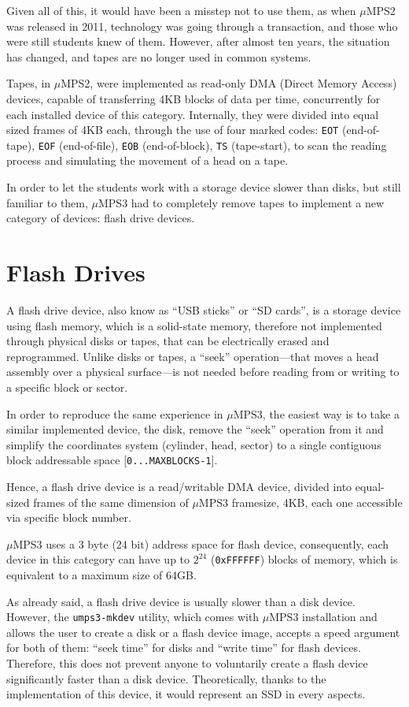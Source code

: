 \documentclass[12pt,a4paper,openright,twoside]{report}
\begin{document}
Given all of this, it would have been a misstep not to use them, as when $\mu$MPS2 was released in 2011, technology was going through a transaction, and those who were still students knew of them.
However, after almost ten years, the situation has changed, and tapes are no longer used in common systems.

Tapes, in $\mu$MPS2, were implemented as read-only DMA (Direct Memory Access) devices, capable of transferring 4KB blocks of data per time, concurrently for each installed device of this category.
Internally, they were divided into equal sized frames of 4KB each, through the use of four marked codes: \texttt{EOT} (end-of-tape), \texttt{EOF} (end-of-file), \texttt{EOB} (end-of-block), \texttt{TS} (tape-start), to scan the reading process and simulating the movement of a head on a tape.

In order to let the students work with a storage device slower than disks, but still familiar to them, $\mu$MPS3 had to completely remove tapes to implement a new category of devices: flash drive devices.

\section{Flash Drives}
A flash drive device, also know as ``USB sticks'' or ``SD cards'', is a storage device using flash memory, which is a solid-state memory, therefore not implemented through physical disks or tapes, that can be electrically erased and reprogrammed.
Unlike disks or tapes, a ``seek'' operation---that moves a head assembly over a physical surface---is not needed before reading from or writing to a specific block or sector.

In order to reproduce the same experience in $\mu$MPS3, the easiest way is to take a similar implemented device, the disk, remove the ``seek'' operation from it and simplify the coordinates system (cylinder, head, sector) to a single contiguous block addressable space [\texttt{0...MAXBLOCKS-1}].

Hence, a flash drive device is a read/writable DMA device, divided into equal-sized frames of the same dimension of $\mu$MPS3 framesize, 4KB, each one accessible via specific block number.

$\mu$MPS3 uses a 3 byte (24 bit) address space for flash device, consequently, each device in this category can have up to $2^{24}$ (\texttt{0xFFFFFF}) blocks of memory, which is equivalent to a maximum size of 64GB.

As already said, a flash drive device is usually slower than a disk device.
However, the \texttt{umps3-mkdev} utility, which comes with $\mu$MPS3 installation and allows the user to create a disk or a flash device image, accepts a speed argument for both of them: ``seek time'' for disks and ``write time'' for flash devices.
Therefore, this does not prevent anyone to voluntarily create a flash device significantly faster than a disk device.
Theoretically, thanks to the implementation of this device, it would represent an SSD in every aspects.
\end{document}
